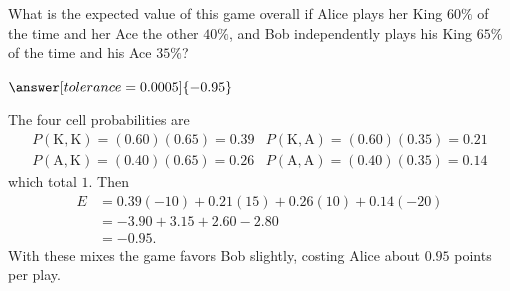\documentclass[12pt]{ximera}
\begin{document}
\begin{problem}
\begin{prompt}
What is the expected value of this game overall if Alice plays her King $60\%$ of the
time and her Ace the other $40\%$, and Bob independently plays his King $65\%$ of the
time and his Ace $35\%$?

$\answer[tolerance=0.0005]{-0.95}$

\begin{solution}
The four cell probabilities are
\[
\begin{array}{ll}
P(\text{K},\text{K})=(0.60)(0.65)=0.39 & P(\text{K},\text{A})=(0.60)(0.35)=0.21\\
P(\text{A},\text{K})=(0.40)(0.65)=0.26 & P(\text{A},\text{A})=(0.40)(0.35)=0.14
\end{array}
\]
which total $1$. \checkmark Then
\begin{align*}
E &= 0.39(-10) + 0.21(15) + 0.26(10) + 0.14(-20)\\
  &= -3.90 + 3.15 + 2.60 - 2.80\\
  &= -0.95.
\end{align*}
With these mixes the game favors Bob slightly, costing Alice about $0.95$ points per
play.
\end{solution}
\end{prompt}
\end{problem}
\end{document}

